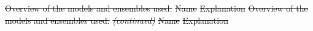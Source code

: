 \documentclass[10pt,letterpaper]{article}
\providecommand{\DIFdeltex}[1]{{\protect\color{red}\sout{#1}}}                      %
\providecommand{\DIFdelbegin}{} %
\providecommand{\DIFdel}[1]{\texorpdfstring{\DIFdeltex{#1}}{}} %
\newcommand{\DIFscaledelfig}{0.5}
\newlength{\DIFdelgraphicswidth} %
\newlength{\DIFdelgraphicsheight} %
\newcommand{\DIFdelincludegraphics}[2][]{%
\sbox{\DIFdelgraphicsbox}{\DIFOincludegraphics[#1]{#2}}%
\settoboxwidth{\DIFdelgraphicswidth}{\DIFdelgraphicsbox} %
\settoboxtotalheight{\DIFdelgraphicsheight}{\DIFdelgraphicsbox} %
\scalebox{\DIFscaledelfig}{%
\parbox[b]{\DIFdelgraphicswidth}{\usebox{\DIFdelgraphicsbox}\\[-\baselineskip] \rule{\DIFdelgraphicswidth}{0em}}\llap{\resizebox{\DIFdelgraphicswidth}{\DIFdelgraphicsheight}{%
\setlength{\unitlength}{\DIFdelgraphicswidth}%
\begin{picture}(1,1)%
\thicklines\linethickness{2pt} %
{\color[rgb]{1,0,0}\put(0,0){\framebox(1,1){}}}%
{\color[rgb]{1,0,0}\put(0,0){\line( 1,1){1}}}%
{\color[rgb]{1,0,0}\put(0,1){\line(1,-1){1}}}%
\end{picture}%
}\hspace*{3pt}}} %
} %
\DeclareRobustCommand{\DIFdelbegin}{\DIFOdelbegin \let\includegraphics\DIFdelincludegraphics} %
\begin{document}
\DIFdelbegin %
{%
\DIFdel{Overview of the models and ensembles used.}}%
\DIFdel{Name }%
\DIFdel{Explanation}%
{%
\DIFdel{Overview of the models and ensembles used. }\textit{\DIFdel{(continued)}}%
}%
\DIFdel{Name }%
\DIFdel{Explanation}%
\end{document}

